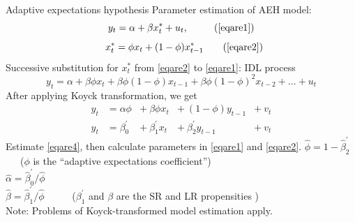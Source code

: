 \documentclass{beamer}
\begin{document}
\begin{frame}{Adaptive expectations hypothesis}
Parameter estimation of AEH model:
\begin{equation}
y_t = \alpha + \beta x_t^\ast + u_t,~~ \tag{\ref{eqare1}}
\end{equation}
\begin{equation}
~~x_t^\ast =  \phi x_t + (1-\phi) x^\ast_{t-1} \tag{\ref{eqare2}}
\end{equation}
Successive substitution for $x_t^\ast$ from \eqref{eqare2} to \eqref{eqare1}: IDL process
\begin{equation}
y_t = \alpha + \beta \phi x_{t} 
    + \beta \phi (1-\phi)x_{t-1} + \beta \phi (1 - \phi)^2 x_{t-2} + \dots + u_t \label{eqare3}
 \end{equation}
After applying Koyck transformation, we get
\begin{equation} \label{eqare4}
\begin{aligned}
y_t &= \alpha \phi &+~ \beta \phi x_{t} &+~ (1-\phi) y_{t-1} &+~ v_t \\
y_t &= \beta_0^{\prime} &+~ \beta_1^{\prime} x_{t} &+~ \beta_2^{\prime} y_{t-1} &+~ v_t
\end{aligned}
\end{equation}
Estimate \eqref{eqare4}, then calculate parameters in \eqref{eqare1} and \eqref{eqare2}.
\smallskip
$\hat{\phi}= 1-\hat{\beta}_2^{\prime}$ ~~~($\phi$ is the ``adaptive expectations coefficient'')\\
\smallskip
$\hat{\alpha} =\hat{\beta}_0^{\prime}/\hat{\phi}$\\
\smallskip
$\hat{\beta} =\hat{\beta}_1^{\prime}/\hat{\phi}$ ~~~~~($\beta_1^{\prime}$ and $\beta$ are the SR and LR propensities )\\
\smallskip
\footnotesize{\qquad Note: Problems of Koyck-transformed model estimation apply.}
\end{frame}
\end{document}
